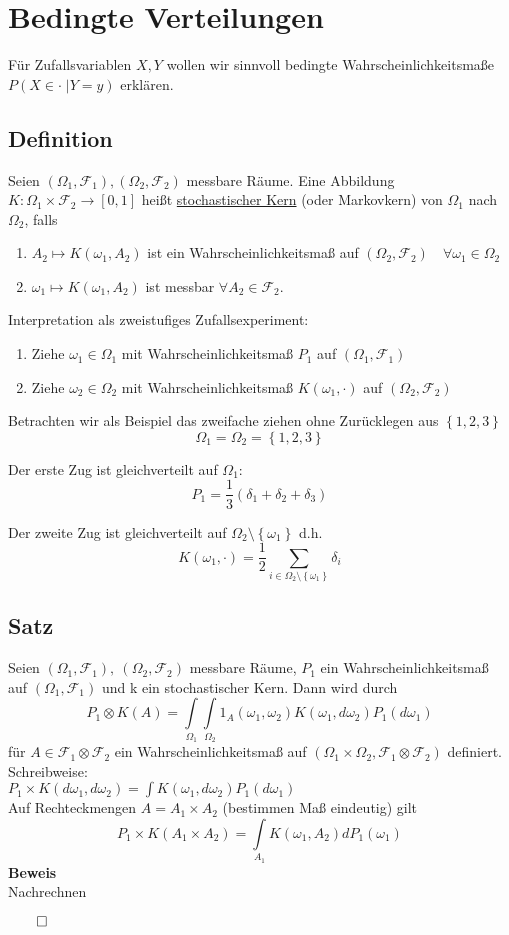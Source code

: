\documentclass[german,10pt,oneside, fleqn, a4paper]{article}
\newcommand{\ra}{\rightarrow}
\newcommand{\sm}[2][\infty]{\sum\limits_{#2}^{#1}}
\newcommand{\brac}[1]{\left\lbrace #1\right\rbrace}
\newcommand{\QED}{\begin{flushright}$\qed$\end{flushright}}
\newcommand{\mc}[1]{\mathcal{#1}}
\newcommand{\beweis}{\textbf{Beweis}\\}
\newcommand{\1}[1]{1_{#1}}
\newcommand{\2}[1]{\1{\brac{#1}}}
\newcommand{\f}{\mc{F}}
\newcommand{\qf}{\quad\forall}
\begin{document}
\section{Bedingte Verteilungen}
Für Zufallsvariablen $X,Y$ wollen wir sinnvoll bedingte Wahrscheinlichkeitsmaße $P(X\in\cdot\;|Y=y)$ erklären.

\subsection{Definition}
\label{7.1}
Seien $(\Omega_1,\f_1),(\Omega_2,\f_2)$ messbare Räume. Eine Abbildung\\
$K:\Omega_1\times\f_2\ra [0,1]$ heißt \underline{stochastischer Kern} (oder Markovkern) von $\Omega_1$ nach $\Omega_2$, falls\begin{enumerate}[label=(\roman*)]
\item $A_2\mapsto K(\omega_1,A_2)$ ist ein Wahrscheinlichkeitsmaß auf $(\Omega_2,\f_2)\qf\omega_1\in\Omega_2$
\item $\omega_1\mapsto K(\omega_1,A_2)$ ist messbar $\forall A_2\in\f_2$.
\end{enumerate}
Interpretation als zweistufiges Zufallsexperiment:\begin{enumerate}
\item Ziehe $\omega_1\in\Omega_1$ mit Wahrscheinlichkeitsmaß $P_1$ auf $(\Omega_1,\f_1)$
\item Ziehe $\omega_2\in\Omega_2$ mit Wahrscheinlichkeitsmaß $K(\omega_1,\cdot)$ auf $(\Omega_2,\f_2)$
\end{enumerate}
Betrachten wir als Beispiel das zweifache ziehen ohne Zurücklegen aus $\brac{1,2,3}$\[
 \Omega_1=\Omega_2=\brac{1,2,3}\]\begin{list}{•}{}
 \item Der erste Zug ist gleichverteilt auf $\Omega_1$:\[
 P_1=\dfrac{1}{3}(\delta_1+\delta_2+\delta_3)\]
 \item Der zweite Zug ist gleichverteilt auf $\Omega_2\setminus\brac{\omega_1}$ d.h.\[
K(\omega_1,\cdot)=\dfrac{1}{2}\sm[]{i\in\Omega_2\setminus\brac{\omega_1}}\delta_i\]
 \end{list}
 
 \subsection{Satz}
 \label{7.2}
 Seien $(\Omega_1,\f_1),\ (\Omega_2,\f_2)$ messbare Räume, $P_1$ ein Wahrscheinlichkeitsmaß auf $(\Omega_1,\f_1)$ und k ein stochastischer Kern. Dann wird durch\[
P_1\otimes K(A)=\int\limits_{\Omega_1}\int\limits_{\Omega_2}1_A(\omega_1,\omega_2)K(\omega_1,d\omega_2)P_1(d\omega_1) 
 \]
 für $A\in\f_1\otimes\f_2$ ein Wahrscheinlichkeitsmaß auf $(\Omega_1\times\Omega_2,\f_1\otimes\f_2)$ definiert.\\
 Schreibweise:\\
 $P_1\times K(d\omega_1,d\omega_2)=\int K(\omega_1,d\omega_2)P_1(d\omega_1)$\\
 Auf Rechteckmengen $A=A_1\times A_2$ (bestimmen Maß eindeutig) gilt \[
P_1\times K(A_1\times A_2)=\int\limits_{A_1}K(\omega_1,A_2)dP_1(\omega_1)
 \]
 \beweis
 Nachrechnen\QED
\end{document}
